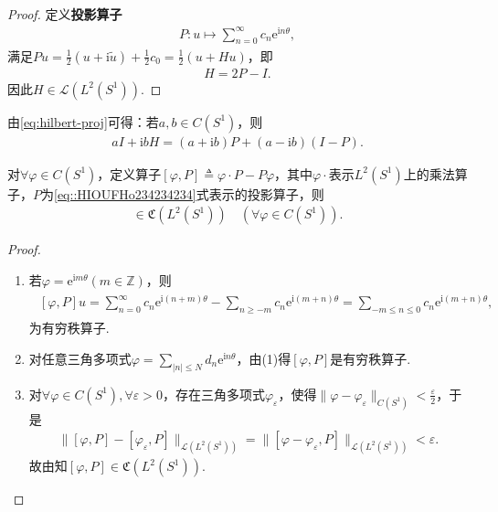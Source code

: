 \documentclass[../../main.tex]{subfiles}%
\begin{document}
\begin{proof}
定义\textbf{投影算子}
\begin{align}\label{eq::HIOUFHo234234234}
P:u\mapsto\sum\limits_{n=0}^{\infty}c_n\mathrm{e}^{\mathrm{i}n\theta},
\end{align}
满足$Pu=\frac{1}{2}(u+\mathrm{i}\widetilde{u})+\frac{1}{2}c_0=\frac{1}{2}(u+Hu)$，即
\begin{align}
H=2P-I.\label{eq:hilbert-proj}
\end{align}
因此$H\in\mathscr{L}(L^2(S^1))$.

\end{proof}

\begin{remark}
由\eqref{eq:hilbert-proj}可得：若$a,b\in C(S^1)$，则
\begin{align}
aI+\mathrm{i}bH=(a+\mathrm{i}b)P+(a-\mathrm{i}b)(I-P).\label{eq:h-op-decomp}
\end{align}
\end{remark}

\begin{lemma}\label{lemma:泛函分析--引理3.6.9}
对$\forall\varphi\in C(S^1)$，定义算子$[\varphi,P]\triangleq\varphi\cdot P-P\varphi$，其中$\varphi\cdot$表示$L^2(S^1)$上的乘法算子，$P$为\eqref{eq::HIOUFHo234234234}式表示的投影算子，则
\begin{align*}
[\varphi,P]\in\mathfrak{C}(L^2(S^1))\quad (\forall\varphi\in C(S^1)).
\end{align*}
\end{lemma}
\begin{proof}
\begin{enumerate}[(1)]
\item 若$\varphi=\mathrm{e}^{\mathrm{i}m\theta}(m\in\mathbb{Z})$，则
\begin{align*}
\begin{aligned}
[\varphi,P]u=\sum\limits_{n=0}^{\infty}c_n\mathrm{e}^{\mathrm{i}(n+m)\theta}-\sum\limits_{n\geqslant-m}c_n\mathrm{e}^{\mathrm{i}(m+n)\theta}
=\sum\limits_{-m\leqslant n\leqslant0}c_n\mathrm{e}^{\mathrm{i}(m+n)\theta},
\end{aligned}
\end{align*}
为有穷秩算子.
\item 对任意三角多项式$\varphi=\sum\limits_{|n|\leqslant N}d_n\mathrm{e}^{\mathrm{i}n\theta}$，由(1)得$[\varphi,P]$是有穷秩算子.
\item 对$\forall\varphi\in C(S^1),\forall\varepsilon>0$，存在三角多项式$\varphi_\varepsilon$，使得$\|\varphi-\varphi_\varepsilon\|_{C(S^1)}<\frac{\varepsilon}{2}$，于是
\begin{align*}
\|[\varphi,P]-[\varphi_\varepsilon,P]\|_{\mathscr{L}(L^2(S^1))}=\|[\varphi-\varphi_\varepsilon,P]\|_{\mathscr{L}(L^2(S^1))}<\varepsilon.
\end{align*}
故由知$[\varphi,P]\in\mathfrak{C}(L^2(S^1))$.
\end{enumerate}

\end{proof}
\end{document}
